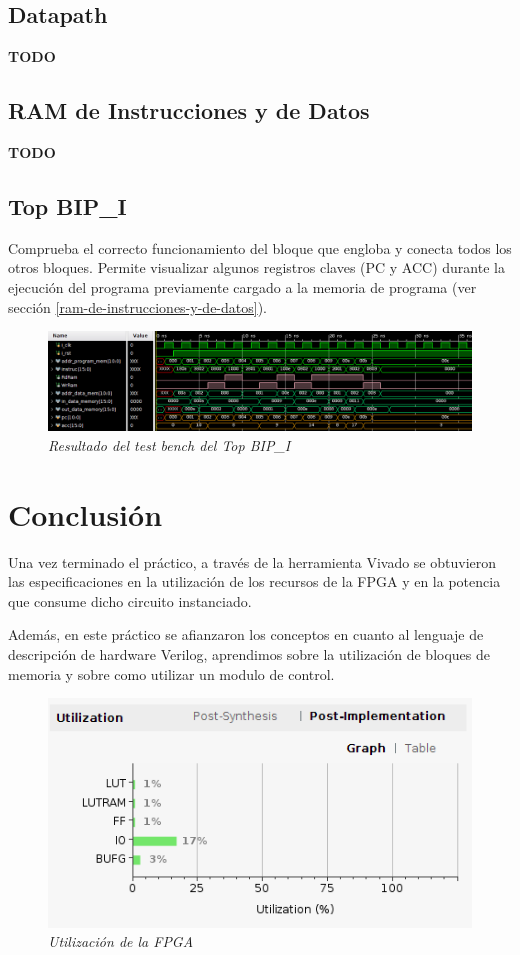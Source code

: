 \documentclass[12pt,A4paper,titlepage]{article}
\begin{document}
\subsection{Datapath}
\textbf{TODO}

\subsection{RAM de Instrucciones y de Datos}
\textbf{TODO}

\subsection{Top BIP\_I}
Comprueba el correcto funcionamiento del bloque que engloba y conecta todos los otros bloques. Permite visualizar algunos registros claves (PC y ACC) durante la ejecución del programa previamente cargado a la memoria de programa (ver sección \ref{ram-de-instrucciones-y-de-datos}).
\begin{figure}[h] 
	\centering
	\includegraphics[width=\textwidth]{figure/tb-topBIP.png}
	\caption{\textit{Resultado del test bench del Top BIP\_I}}
    \label{fig:tb-topBI}
\end{figure}


\newpage
\section{Conclusión}
Una vez terminado el práctico, a través de la herramienta Vivado se
obtuvieron las especificaciones en la utilización de los recursos de la FPGA y en la potencia que consume dicho circuito instanciado.

Además, en este práctico se afianzaron los conceptos en cuanto al lenguaje de descripción de hardware Verilog, aprendimos sobre la utilización de bloques de memoria y sobre como utilizar un modulo de control.

\begin{figure}[H] 
	\centering
	\includegraphics[scale=0.7]{figure/utilizacion.png}
	\caption{\textit{Utilización de la FPGA}}
\end{figure}
\end{document}
